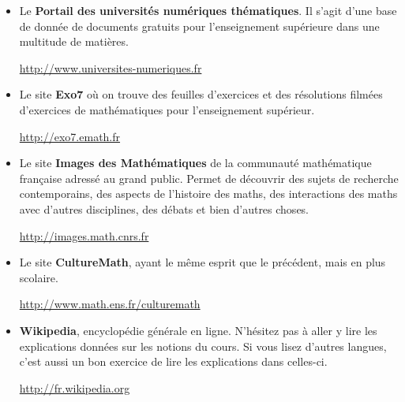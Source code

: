 \begin{itemize}
    \item    Le {\bf Portail des universités numériques thématiques}.
        Il s'agit d'une base de donnée
       de documents gratuits pour l'enseignement supérieure dans une multitude de matières.

         \url{http://www.universites-numeriques.fr}

    \item    Le site {\bf Exo7} où on trouve des feuilles d'exercices et des résolutions filmées d'exercices de mathématiques pour
        l'enseignement supérieur.

         \url{http://exo7.emath.fr}

    \item   Le site {\bf Images des Mathématiques} de la communauté mathématique française
        adressé au grand public. Permet de découvrir des sujets de recherche contemporains,
        des aspects de l'histoire des maths, des interactions des maths avec d'autres disciplines,
        des débats et bien d'autres choses.

        \url{http://images.math.cnrs.fr}

    \item Le site {\bf CultureMath}, ayant le même esprit que le précédent, mais en plus scolaire.

        \url{http://www.math.ens.fr/culturemath}

    \item {\bf Wikipedia}, encyclopédie générale en ligne. N'hésitez pas à aller y lire les
        explications données sur les notions du cours. Si vous lisez d'autres langues, c'est
        aussi un bon exercice de lire les explications dans celles-ci.

        \url{http://fr.wikipedia.org}
\end{itemize}


